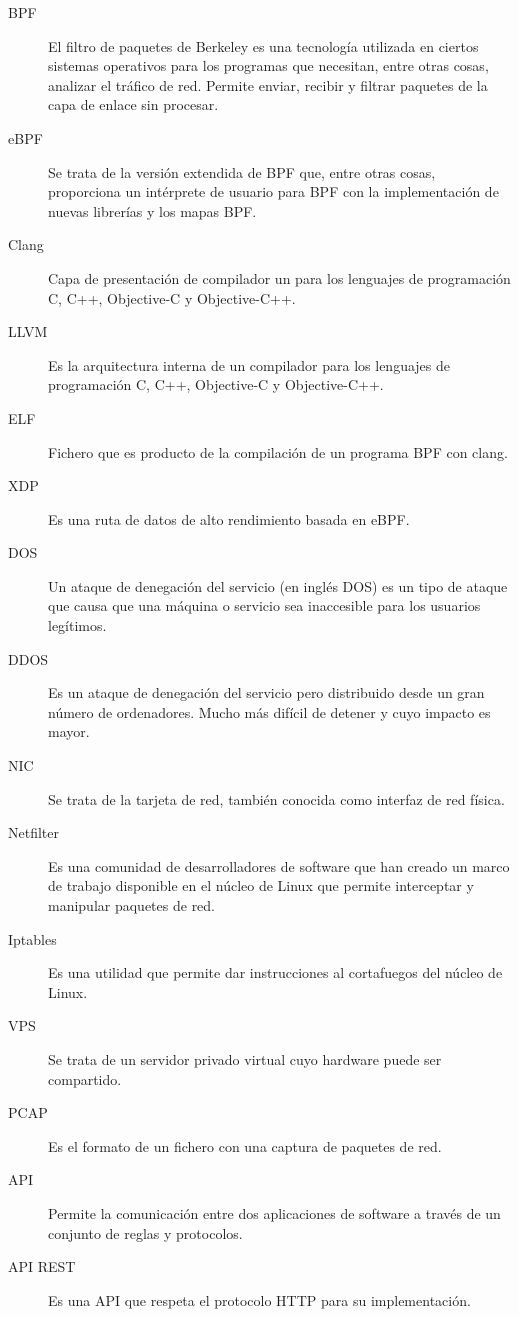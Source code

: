 \begin{description}
    \item [BPF] El filtro de paquetes de Berkeley es una tecnología utilizada en ciertos sistemas operativos para los programas que necesitan, entre otras cosas, analizar el tráfico de red. Permite enviar, recibir y filtrar paquetes de la capa de enlace sin procesar.
    \item [eBPF] Se trata de la versión extendida de BPF que, entre otras cosas, proporciona un intérprete de usuario para BPF con la implementación de nuevas librerías y los mapas BPF.
    \item [Clang] Capa de presentación de compilador un para los lenguajes de programación C, C++, Objective-C y Objective-C++.
     \item [LLVM ] Es la arquitectura interna de un compilador para los lenguajes de programación C, C++, Objective-C y Objective-C++.
   \item [ELF] Fichero que es producto de la compilación de un programa BPF con clang.
  \item [XDP] Es una ruta de datos de alto rendimiento basada en eBPF.
  \item [DOS] Un ataque de denegación del servicio (en inglés DOS) es un tipo de ataque que causa que una máquina o servicio sea inaccesible para los usuarios legítimos.
  \item [DDOS] Es un ataque de denegación del servicio pero distribuido desde un gran número de ordenadores. Mucho más difícil de detener y cuyo impacto es mayor.
   \item [NIC] Se trata de la tarjeta de red, también conocida como interfaz de red física.
  \item [Netfilter] Es una comunidad de desarrolladores de software que han creado un marco de trabajo disponible en el núcleo de Linux que permite interceptar y manipular paquetes de red.
  \item [Iptables] Es una utilidad que permite dar instrucciones al cortafuegos del núcleo de Linux.
    \item [VPS] Se trata de un servidor privado virtual cuyo hardware puede ser compartido.
    \item [PCAP] Es el formato de un fichero con una captura de paquetes de red.
    \item [API] Permite la comunicación entre dos aplicaciones de software a través de un conjunto de reglas y protocolos.
    \item [API REST] Es una API que respeta el protocolo HTTP para su implementación.
  
\end{description}